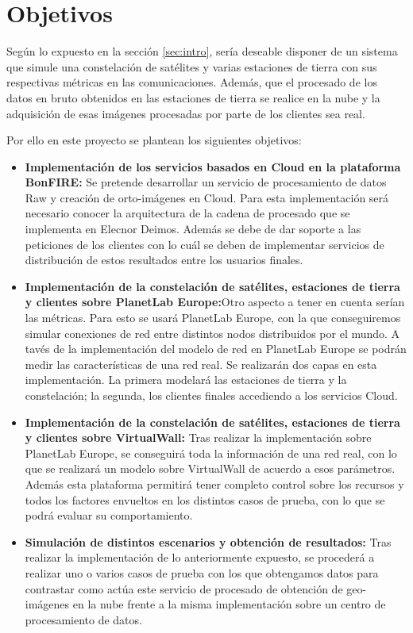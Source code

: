 
\section{Objetivos}
\label{sec:objetivos}

Según lo expuesto en la sección \ref{sec:intro}, sería deseable disponer de
un sistema que simule una constelación de satélites y varias estaciones de tierra con sus respectivas métricas en las comunicaciones. Además, que el procesado de los datos en bruto obtenidos en las estaciones de tierra se realice en la nube y la adquisición de esas imágenes procesadas por parte de los clientes sea real.

Por ello en este proyecto se plantean los siguientes objetivos:

\begin{itemize}

\item \textbf{Implementación de los servicios basados en Cloud en la plataforma BonFIRE:}  Se pretende desarrollar un servicio de procesamiento de datos Raw y creación de orto-imágenes en Cloud. Para esta implementación será necesario conocer la arquitectura de la cadena de procesado que se implementa en Elecnor Deimos. Además se debe de dar soporte a las peticiones de los clientes con lo cuál se deben de implementar servicios de distribución de estos resultados entre los usuarios finales.

\item \textbf{Implementación de la constelación de satélites, estaciones de tierra y clientes sobre PlanetLab Europe:}Otro aspecto a tener en cuenta serían las métricas. Para esto se usará PlanetLab Europe, con la que conseguiremos simular conexiones de red entre distintos nodos distribuidos por el mundo.
A tavés de la implementación del modelo de red en PlanetLab Europe se podrán medir las características de una red real. Se realizarán dos capas en esta implementación. La primera modelará las estaciones de tierra y la constelación; la segunda, los clientes finales accediendo a los servicios Cloud.

\item \textbf{Implementación de la constelación de satélites, estaciones de tierra y clientes sobre VirtualWall:} Tras realizar la implementación sobre PlanetLab Europe, se conseguirá toda la información de una red real, con lo que se realizará un modelo sobre VirtualWall de acuerdo a esos parámetros. Además esta plataforma permitirá tener completo control sobre los recursos y todos los factores envueltos en los distintos casos de prueba, con lo que se podrá evaluar su comportamiento.

\item \textbf{Simulación de distintos escenarios y obtención de resultados:} Tras realizar la implementación de lo anteriormente expuesto, se procederá a realizar uno o varios casos de prueba con los que obtengamos datos para contrastar como actúa este servicio de procesado de obtención de geo-imágenes en la nube frente a la misma implementación sobre un centro de procesamiento de datos.



\end{itemize}







